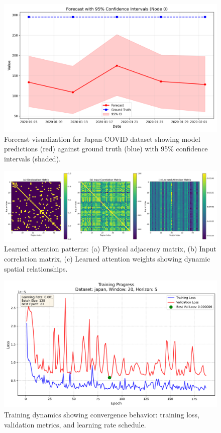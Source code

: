 \documentclass[lettersize, journal]{IEEEtran}
\begin{document}
\begin{figure}[t]
    \centering
    \includegraphics[width=\columnwidth]{../figures/forecast_japan.w-20.h-5.png}
    \caption{Forecast visualization for Japan-COVID dataset showing model predictions (red) against ground truth (blue) with 95\% confidence intervals (shaded).}
    \label{fig:forecast_japan}
\end{figure}

\begin{figure}[t]
    \centering
    \includegraphics[width=\columnwidth]{../figures/matrices_japan.w-20.h-5.png}
    \caption{Learned attention patterns: (a) Physical adjacency matrix, (b) Input correlation matrix, (c) Learned attention weights showing dynamic spatial relationships.}
    \label{fig:attention_vis}
\end{figure}

\begin{figure}[t]
    \centering
    \includegraphics[width=\columnwidth]{../figures/loss_curve_japan.w-20.h-5.png}
    \caption{Training dynamics showing convergence behavior: training loss, validation metrics, and learning rate schedule.}
    \label{fig:training_curves}
\end{figure}
\end{document}
